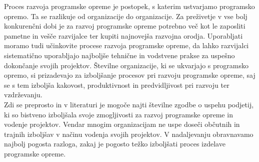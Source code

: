 \documentclass[a4paper,12pt,openright]{book}
\begin{document}
Proces razvoja programske opreme je postopek, s katerim ustvarjamo programsko opremo. Ta se razlikuje od organizacije do organizacije. Za preživetje v vse bolj konkurenčni dobi je za razvoj programske opreme potrebno več kot le zaposliti pametne in vešče razvijalce ter kupiti najnovejša razvojna orodja. Uporabljati moramo tudi učinkovite procese razvoja programske opreme, da lahko razvijalci sistematično uporabljajo najboljše tehnične in vodstvene prakse za uspešno dokončanje svojih projektov. Številne organizacije, ki se ukvarjajo s programsko opremo, si prizadevajo za izboljšanje procesov pri razvoju programske opreme, saj se s tem izboljša kakovost, produktivnost in predvidljivost pri razvoju ter vzdrževanju. \\
Zdi se preprosto in v literaturi je mogoče najti številne zgodbe o uspehu podjetij, ki so bistveno izboljšala svoje zmogljivosti za razvoj programske opreme in vodenje projektov. Vendar mnogim organizacijam ne uspe doseči občutnih in trajnih izboljšav v načinu vodenja svojih projektov. V nadaljevanju obravnavamo najbolj pogosta razloga, zakaj je pogosto težko izboljšati proces izdelave programske opreme.
\cite{aggarwal2005software, humphrey1989managing}
\end{document}
